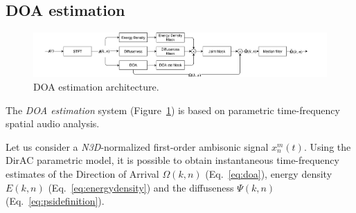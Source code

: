 \subsection{DOA estimation}
\label{ssec:doa_estimation}

\begin{figure}[h]

    \includegraphics[width=\textwidth]{Figures/SELD/DOA1.pdf}
    \caption{DOA estimation architecture.}
    \label{fig:doa}

\end{figure}



The \textit{DOA estimation} system (Figure~\ref{fig:doa}) is based on parametric time-frequency spatial audio analysis.

Let us consider a \textit{N3D}-normalized first-order ambisonic signal $x_n^m(t)$. 
Using the DirAC parametric model, it is possible to obtain instantaneous time-frequency estimates of the Direction of Arrival $\Omega(k,n)$ (Eq.~\ref{eq:doa}), energy density $E(k,n)$ (Eq.~\ref{eq:energydensity}) and the diffuseness $\Psi(k,n)$ (Eq.~\ref{eq:psidefinition}).\\




